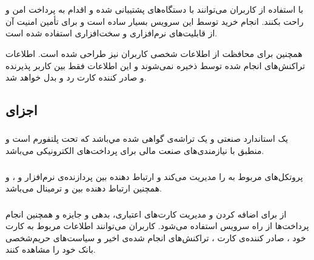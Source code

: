 \documentclass[oneside]{report}
\begin{document}
 \section{{\large{}} }
	 با استفاده از
	 						{\normalsize {}}
کاربران می‌توانند با  دستگاه‌های 
{\normalsize {}}
	پشتیبانی شده و 
	{\normalsize {}}
	اقدام به پرداخت امن و راحت بکنند. 
انجام خرید توسط این سرویس بسیار ساده است و برای تأمین امنیت آن از قابلیت‌های نرم‌افزاری و سخت‌افزاری استفاده شده است.

{\normalsize {}}
همچنین برای محافظت از اطلاعات شخصی کاربران نیز طراحی شده است. اطلاعات تراکنش‌های انجام شده توسط 
{\normalsize {}}
ذخیره نمی‌شوند و این اطلاعات فقط بین کاربر پذیرنده و صادر کننده کارت رد‌‌ و بدل خواهد شد.

\subsection{اجزای {\normalsize {}} }
 
 \subsubsection{{\small {}}}
 {\normalsize {}}
 یک استاندارد صنعتی و یک تراشه‌ی گواهی شده
 مي‌باشد که تحت پلتفورم 
 {\normalsize {}}
 است و منطبق با نیازمندی‌های صنعت مالی برای پرداخت‌های الکترونیکی می‌باشد.
 
  \subsubsection{{\small {}}}
  {\normalsize {}}
  پروتکل‌های مربوط به 
   {\normalsize {}}
   را مدیریت می‌کند و ارتباط دهنده بین پردازنده‌ی نرم‌افزار 
  و 
   {\normalsize {}}
   ، و همچنین ارتباط دهنده بین 
    {\normalsize {}}
    و ترمینال
     {\normalsize {}} 
      می‌باشد.
      
        \subsubsection{{\small {}}}
        از
           {\normalsize {}}
           برای اضافه کردن و مدیریت کارت‌های اعتباری، بدهی و جایزه و همچنین انجام پرداخت‌ها از راه سرویس 
              {\normalsize {}}
              استفاده می‌شود.
              کاربران می‌توانند اطلاعات مربوط به کارت خود ، صادر کننده‌ی کارت ، تراکنش‌های انجام شده‌ی اخیر و سیاست‌های حریم‌شخصی 
              بانک خود را مشاهده کنند.
 
\end{document}
